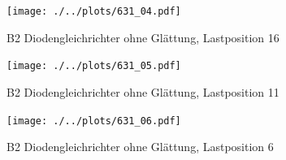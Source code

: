 \begin{figure}[h!]
    \centering
    \texttt{[image: ./../plots/631\_04.pdf]}
    \caption{B2 Diodengleichrichter ohne Glättung, Lastposition 16}
\end{figure}

\begin{figure}[h!]
    \centering
    \texttt{[image: ./../plots/631\_05.pdf]}
    \caption{B2 Diodengleichrichter ohne Glättung, Lastposition 11}
\end{figure}

\begin{figure}[h!]
    \centering
    \texttt{[image: ./../plots/631\_06.pdf]}
    \caption{B2 Diodengleichrichter ohne Glättung, Lastposition 6}
\end{figure}


\clearpage
